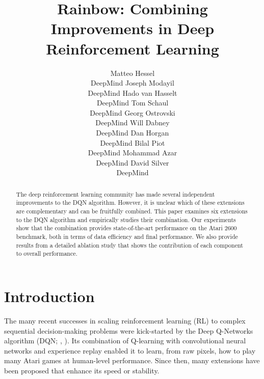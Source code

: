 \documentclass[letterpaper]{article} \usepackage{aaai18}  \usepackage{times}  \usepackage{helvet}  \usepackage{courier}  \usepackage{url}  \usepackage{graphicx}  \usepackage{amsmath,amssymb}
\begin{document}
\title{
Rainbow: Combining Improvements in Deep Reinforcement Learning
}
\author{Matteo Hessel\\ DeepMind \And Joseph Modayil\\ DeepMind \And Hado van Hasselt\\ DeepMind
\And Tom Schaul\\ DeepMind \And Georg Ostrovski\\ DeepMind \AND Will Dabney\\ DeepMind \And Dan Horgan\\ DeepMind \And Bilal Piot \\ DeepMind \And Mohammad Azar \\ DeepMind \And David Silver\\ DeepMind
}
\maketitle
\begin{abstract}
The deep reinforcement learning community has made several independent improvements to the DQN algorithm. However, it is unclear which of these extensions are complementary and can be fruitfully combined. This paper examines six extensions to the DQN algorithm and empirically studies their combination.  Our experiments show that the combination provides state-of-the-art performance on the Atari 2600 benchmark, both in terms of data efficiency and final performance. We also provide results from a detailed ablation study that shows the contribution of each component to overall performance.
\end{abstract}

\section{Introduction}

The many recent successes in scaling reinforcement learning (RL) to complex sequential decision-making problems were kick-started by the Deep Q-Networks algorithm (DQN; \citeauthor{Mnih2015} \citeyear{dqn-arxiv}, \citeyear{Mnih2015}). 
Its combination of Q-learning with convolutional neural networks and experience replay enabled it to learn, from raw pixels, how to play many Atari games at human-level performance.
Since then, many extensions have been proposed that enhance its speed or stability. 
\end{document}
